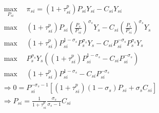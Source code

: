 \begin{gather*}
    \max_{P_{si}} \quad\pi_{si} =  (1+\tau_{si}^p)P_{si}Y_{si} - C_{si} {Y}_{si} \\
    \max  \quad (1+\tau_{si}^p)P_{si}( \frac{P_s}{ P_{si}})^{\sigma_s}{Y}_s - C_{si} (\frac{P_s}{ P_{si}})^{\sigma_s}{Y}_s \\
    \max \quad  (1+\tau_{si}^p)P_{si}^{1-\sigma_s}P_s^{\sigma_s}{Y}_s - C_{si} P_{si}^{-\sigma_s}P_s^{\sigma_s}{Y}_s \\
    \max \quad P_s^{\sigma_s}{Y}_s \left(
        (1+\tau_{si}^p)P_{si}^{1-\sigma_s} - C_{si} P_{si}^{-\sigma_s} 
    \right)\\
    \max \quad  (1+\tau_{si}^p)P_{si}^{1-\sigma_s} - C_{si} P_{si}^{-\sigma_s} \\
    \Rightarrow 0 = P_{si}^{-\sigma_s - 1} \left[
        (1+\tau_{si}^p)(1-\sigma_s)P_{si} + \sigma_s C_{si} 
    \right]
    \\
    \Rightarrow P_{si} = \frac{1}{1+\tau_{si}^p}\frac{\sigma_s}{\sigma_s - 1} C_{si} 
\end{gather*}